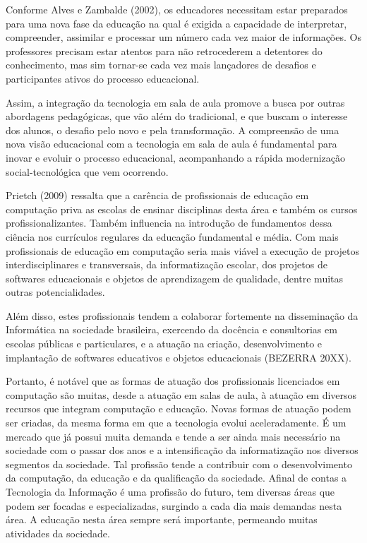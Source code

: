 Conforme Alves e Zambalde (2002), os educadores necessitam estar preparados para uma nova fase da educação na qual é exigida a capacidade de interpretar, compreender, assimilar e processar um número cada vez maior de informações. Os professores precisam estar atentos para não retrocederem a detentores do conhecimento, mas sim tornar-se cada vez mais lançadores de desafios e participantes ativos do processo educacional.


Assim, a integração da tecnologia em sala de aula promove a busca por outras abordagens pedagógicas, que vão além do tradicional, e que buscam o interesse dos alunos, o desafio pelo novo e pela transformação. A compreensão de uma nova visão educacional com a tecnologia em sala de aula é fundamental para inovar e evoluir o processo educacional, acompanhando a rápida modernização social-tecnológica que vem ocorrendo.


	Prietch (2009) ressalta que a carência de profissionais de educação em computação priva as escolas de ensinar disciplinas desta área e também os cursos profissionalizantes. Também influencia na introdução de fundamentos dessa ciência nos currículos regulares da educação fundamental e média. Com mais profissionais de educação em computação seria mais viável a execução de projetos interdisciplinares e transversais, da informatização escolar, dos projetos de softwares educacionais e objetos de aprendizagem de qualidade, dentre muitas outras potencialidades.
    
    
	Além disso, estes profissionais tendem a colaborar fortemente na disseminação da Informática na sociedade brasileira, exercendo da docência e consultorias em escolas públicas e particulares, e a atuação na criação, desenvolvimento e implantação de softwares educativos e objetos educacionais (BEZERRA 20XX).
    
    
	Portanto, é notável que as formas de atuação dos profissionais licenciados em computação são muitas, desde a atuação em salas de aula, à atuação em diversos recursos que integram computação e educação. Novas formas de atuação podem ser criadas, da mesma forma em que a tecnologia evolui aceleradamente. É um mercado que já possui muita demanda e tende a ser ainda mais necessário na sociedade com o passar dos anos e a intensificação da informatização nos diversos segmentos da sociedade. Tal profissão tende a contribuir com o desenvolvimento da computação, da educação e da qualificação da sociedade. Afinal de contas a Tecnologia da Informação é uma profissão do futuro, tem diversas áreas que podem ser focadas e especializadas, surgindo a cada dia mais demandas nesta área. A educação nesta área sempre será importante, permeando muitas atividades da sociedade. 
 
